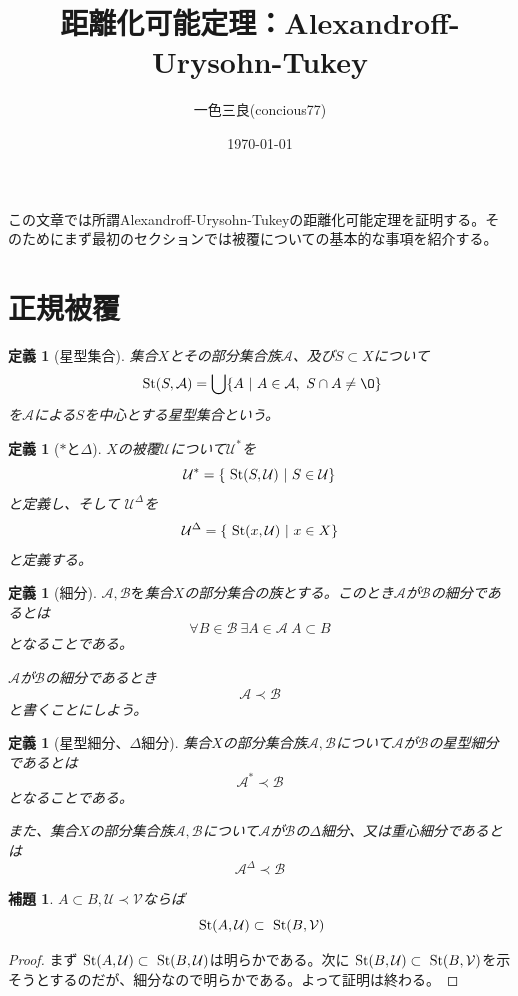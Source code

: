 \documentclass[leqno]{jsarticle}
\title{距離化可能定理：Alexandroff-Urysohn-Tukey}
\author{一色三良(concious77)}
\date{\today}
\newtheorem{lem}[thm]{補題}
\newtheorem{df}[thm]{定義}
\newcommand{\s}{\text{  {\rm St}} }
\newcommand{\uu}{\mathcal{U}}
\newcommand{\vv}{\mathcal{V}}
\newcommand{\A}{\mathcal{A}}
\newcommand{\B}{\mathcal{B}}
\newcommand{\dd}{\Delta}
\newcommand{\pr}{\prec}
\begin{document}
\maketitle

この文章では所謂Alexandroff-Urysohn-Tukeyの距離化可能定理を証明する。そのためにまず最初のセクションでは被覆についての基本的な事項を紹介する。

\section*{正規被覆}

\begin{df}[星型集合]
集合$X$とその部分集合族$\mathcal{A}$、及び$S\subset X$について
\[
\s(S,\mathcal{A})=\bigcup\{A\ |\ A\in \mathcal{A},\ S\cap A\neq\O\}
\]
を$\mathcal{A}$による$S$を中心とする星型集合という。
\end{df}

\begin{df}[$*$と$\Delta$]
$X$の被覆$\uu$について$\uu^{*}$を
\[
\uu^{*}=\{\s(S,\uu)\ |\ S\in \uu\}
\]
と定義し、そして
$\uu^{\Delta}$を
\[
\uu^{\Delta}=\{\s(x,\uu)\ |\ x\in X\}
\]
と定義する。
\end{df}


\begin{df}[細分]
$\mathcal{A},\mathcal{B}を$集合$X$の部分集合の族とする。このとき$\mathcal{A}$が$\mathcal{B}$の細分であるとは
\[
\forall B\in \mathcal{B}\ \exists A\in \mathcal{A}\ A\subset B
\]
となることである。\par
$\A$が$\B$の細分であるとき
\[
\A\pr \B
\]
と書くことにしよう。
\end{df}


\begin{df}[星型細分、$\Delta$細分]
集合$X$の部分集合族$\mathcal{A},\B$について$\A$が$\B$の星型細分であるとは
\[
\A^{*}\pr \B
\]
となることである。\par
また、集合$X$の部分集合族$\mathcal{A},\B$について$\mathcal{A}$が$\B$の$\Delta$細分、又は重心細分であるとは
\[
\A^{\dd}\pr\B
\]
\end{df}

\begin{lem}\label{benri}
$A\subset B,\uu\pr \mathcal{V}$ならば
\[
\s(A,\uu)\subset \s(B,\mathcal{V})
\]
\end{lem}
\begin{proof}
まず$\s(A,\uu)\subset \s(B,\uu)$は明らかである。次に$\s(B,\uu)\subset \s(B,\vv)$を示そうとするのだが、細分なので明らかである。よって証明は終わる。
\end{proof}
\end{document}
